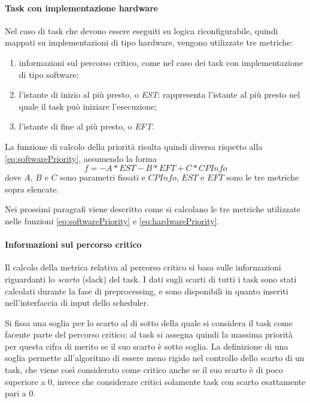 \paragraph{Task con implementazione hardware}
Nel caso di task che devono essere eseguiti su logica riconfigurabile, quindi 
mappati su implementazioni di tipo hardware, vengono utilizzate tre metriche:
\begin{enumerate}
 \item informazioni sul percorso critico, come nel caso dei task con 
implementazione di tipo software;
 \item l'istante di inizio al più presto, o \emph{\ac{EST}}: rappresenta 
l'istante al più presto nel quale il task può iniziare l'esecuzione;
 \item l'istante di fine al più presto, o \emph{\ac{EFT}}.
\end{enumerate}
La funzione di calcolo della priorità risulta quindi diversa rispetto alla 
\ref{eq:softwarePriority}, assumendo la forma
\begin{equation} \label{eq:hardwarePriority}
 f=-A*EST - B*EFT + C*CPInfo
\end{equation}
dove $A$, $B$ e $C$ sono parametri fissati e $CPInfo$, $EST$ e $EFT$ sono le 
tre metriche sopra elencate.

Nei prossimi paragrafi viene descritto come si calcolano le tre metriche 
utilizzate nelle funzioni \ref{eq:softwarePriority} e \ref{eq:hardwarePriority}.

\paragraph{Informazioni sul percorso critico}
Il calcolo della metrica relativa al percorso critico si basa sulle 
informazioni riguardanti lo \emph{scarto} (slack) del task. I dati sugli 
scarti di tutti i task sono stati calcolati durante la fase di preprocessing, 
e sono disponibili in quanto inseriti nell'interfaccia di input dello scheduler.

Si fissa una soglia per lo scarto al di sotto della quale si considera il task 
come facente parte del percorso critico; al task si assegna quindi la massima 
priorità per questa cifra di merito se il suo scarto è sotto soglia. La 
definizione di una soglia permette all'algoritmo di essere meno rigido nel 
controllo dello scarto di un task, che viene così considerato come critico anche 
se il suo scarto è di poco superiore a $0$, invece che considerare critici 
solamente task con scarto esattamente pari a $0$.

